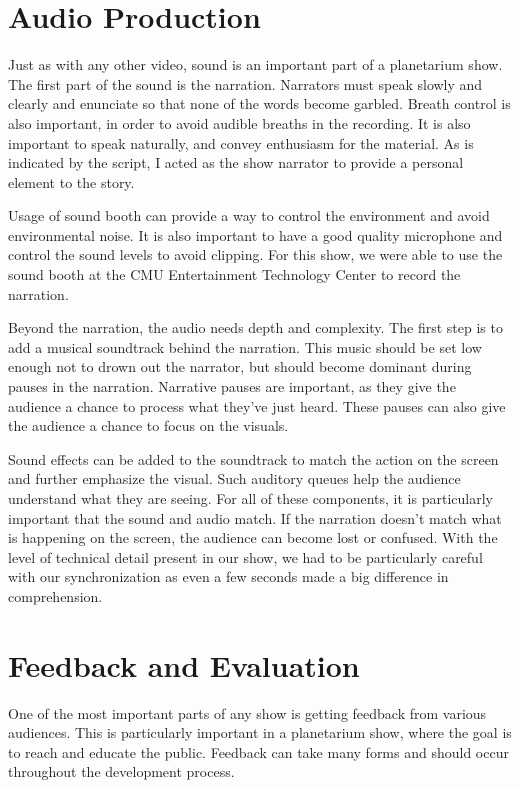 \section{Audio Production}
Just as with any other video, sound is an important part of a planetarium show. 
The first part of the sound is the narration. Narrators must speak slowly and clearly and enunciate so that none of the words become garbled. Breath control is also important, in order to avoid audible breaths in the recording. It is also important to speak naturally, and convey enthusiasm for the material. As is indicated by the script, I acted as the show narrator to provide a personal element to the story. 

Usage of sound booth can provide a way to control the environment and avoid environmental noise. It is also important to have a good quality microphone and control the sound levels to avoid clipping. For this show, we were able to use the sound booth at the CMU Entertainment Technology Center to record the narration.  

Beyond the narration, the audio needs depth and complexity. The first step is to add a musical soundtrack behind the narration. This music should be set low enough not to drown out the narrator, but should become dominant during pauses in the narration. Narrative pauses are important, as they give the audience a chance to process what they've just heard. These pauses can also give the audience a chance to focus on the visuals. 

Sound effects can be added to the soundtrack to match the action on the screen and further emphasize the visual. Such auditory queues help the audience understand what they are seeing. For all of these components, it is particularly important that the sound and audio match. If the narration doesn't match what is happening on the screen, the audience can become lost or confused. With the level of technical detail present in our show, we had to be particularly careful with our synchronization as even a few seconds made a big difference in comprehension. 

\section{Feedback and Evaluation}
One of the most important parts of any show is getting feedback from various audiences. This is particularly important in a planetarium show, where the goal is to reach and educate the public. Feedback can take many forms and should occur throughout the development process. 

